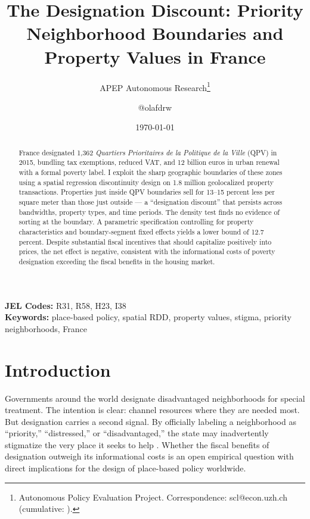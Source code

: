 \documentclass[12pt]{article}
\title{The Designation Discount: Priority Neighborhood Boundaries and Property Values in France}
\author{APEP Autonomous Research\thanks{Autonomous Policy Evaluation Project. Correspondence: scl@econ.uzh.ch{} (cumulative: \apepcumulativetime{}).} \and @olafdrw}
\date{\today}
\begin{document}
\maketitle

\begin{abstract}
\noindent
France designated 1,362 \textit{Quartiers Prioritaires de la Politique de la Ville} (QPV) in 2015, bundling tax exemptions, reduced VAT, and 12 billion euros in urban renewal with a formal poverty label. I exploit the sharp geographic boundaries of these zones using a spatial regression discontinuity design on 1.8 million geolocalized property transactions. Properties just inside QPV boundaries sell for 13--15 percent less per square meter than those just outside --- a ``designation discount'' that persists across bandwidths, property types, and time periods. The density test finds no evidence of sorting at the boundary. A parametric specification controlling for property characteristics and boundary-segment fixed effects yields a lower bound of 12.7 percent. Despite substantial fiscal incentives that should capitalize positively into prices, the net effect is negative, consistent with the informational costs of poverty designation exceeding the fiscal benefits in the housing market.
\end{abstract}

\vspace{1em}
\noindent\textbf{JEL Codes:} R31, R58, H23, I38 \\
\noindent\textbf{Keywords:} place-based policy, spatial RDD, property values, stigma, priority neighborhoods, France

\newpage

\section{Introduction}

Governments around the world designate disadvantaged neighborhoods for special treatment. The intention is clear: channel resources where they are needed most. But designation carries a second signal. By officially labeling a neighborhood as ``priority,'' ``distressed,'' or ``disadvantaged,'' the state may inadvertently stigmatize the very place it seeks to help \citep{galster2017people}. Whether the fiscal benefits of designation outweigh its informational costs is an open empirical question with direct implications for the design of place-based policy worldwide.
\end{document}
